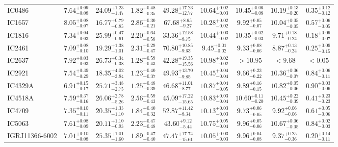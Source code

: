 \documentclass[onecolumn]{mn2e}
\begin{document}
{\begin{center}
\begin{longtable}{lcccccccc}
IC0486 & $7.64_{-0.08}^{+0.09}$ & $24.09_{-1.47}^{+1.23}$ & $1.82_{-0.35}^{+0.48}$ &$49.28_{-12.77}^{+17.23}$ & $10.64_{-0.03}^{+0.02}$ & $10.45_{-0.08}^{+0.06}$ & $10.19_{-0.20}^{+0.13}$ & $0.35_{-0.12}^{+0.12}$ \\
IC1657 & $8.05_{-0.07}^{+0.08}$ & $16.77_{-0.85}^{+0.79}$ & $2.86_{-0.21}^{+0.30}$ &$67.68_{-9.27}^{+8.65}$ & $10.28_{-0.02}^{+0.02}$ & $9.92_{-0.07}^{+0.05}$ & $10.04_{-0.05}^{+0.05}$ & $0.57_{-0.05}^{+0.06}$ \\
IC1816 & $7.34_{-0.03}^{+0.04}$ & $25.99_{-0.61}^{+0.47}$ & $2.20_{-0.58}^{+0.64}$ &$33.36_{-8.75}^{+12.58}$ & $10.44_{-0.02}^{+0.03}$ & $10.35_{-0.03}^{+0.02}$ & $9.71_{-0.24}^{+0.18}$ & $0.18_{-0.07}^{+0.09}$ \\
IC2461 & $7.09_{-0.10}^{+0.08}$ & $19.29_{-1.01}^{+1.38}$ & $2.31_{-0.47}^{+0.29}$ &$70.80_{-9.63}^{+10.85}$ & $9.45_{-0.02}^{+0.01}$ & $9.33_{-0.06}^{+0.08}$ & $8.87_{-0.24}^{+0.13}$ & $0.25_{-0.15}^{+0.09}$ \\
IC2637 & $7.92_{-0.03}^{+0.03}$ & $26.73_{-0.38}^{+0.34}$ & $1.28_{-0.43}^{+0.59}$ &$42.28_{-15.56}^{+19.35}$ & $10.98_{-0.02}^{+0.02}$ & $>10.95$ & $<9.68$ & $<0.05$ \\
IC2921 & $7.54_{-0.29}^{+0.39}$ & $18.35_{-3.84}^{+4.02}$ & $1.23_{-0.37}^{+0.40}$ &$49.93_{-9.85}^{+13.70}$ & $10.45_{-0.04}^{+0.04}$ & $9.66_{-0.22}^{+0.23}$ & $10.36_{-0.07}^{+0.06}$ & $0.84_{-0.11}^{+0.06}$ \\
IC4329A & $6.91_{-0.17}^{+0.15}$ & $25.71_{-2.75}^{+3.48}$ & $1.25_{-0.39}^{+0.48}$ &$46.68_{-8.77}^{+11.01}$ & $10.87_{-0.05}^{+0.04}$ & $9.89_{-0.15}^{+0.16}$ & $10.82_{-0.06}^{+0.05}$ & $0.90_{-0.06}^{+0.03}$ \\
IC4518A & $7.59_{-0.16}^{+0.37}$ & $26.06_{-5.26}^{+2.78}$ & $2.56_{-0.43}^{+0.59}$ &$45.09_{-15.65}^{+17.22}$ & $10.83_{-0.04}^{+0.03}$ & $10.60_{-0.20}^{+0.11}$ & $10.45_{-0.39}^{+0.22}$ & $0.41_{-0.23}^{+0.23}$ \\
IC4709 & $7.35_{-0.11}^{+0.10}$ & $20.35_{-1.10}^{+1.33}$ & $1.84_{-0.32}^{+0.40}$ &$52.87_{-8.34}^{+11.42}$ & $10.13_{-0.03}^{+0.03}$ & $9.73_{-0.05}^{+0.06}$ & $9.92_{-0.06}^{+0.06}$ & $0.61_{-0.06}^{+0.05}$ \\
IC5063 & $7.61_{-0.09}^{+0.08}$ & $20.11_{-0.93}^{+1.10}$ & $2.23_{-0.48}^{+0.47}$ &$43.60_{-5.44}^{+9.12}$ & $10.75_{-0.04}^{+0.05}$ & $9.96_{-0.06}^{+0.05}$ & $10.67_{-0.05}^{+0.06}$ & $0.84_{-0.03}^{+0.02}$ \\
IGRJ11366-6002 & $7.01_{-0.08}^{+0.10}$ & $25.35_{-1.60}^{+1.01}$ & $1.89_{-0.40}^{+0.47}$ &$47.47_{-15.61}^{+17.74}$ & $10.05_{-0.03}^{+0.03}$ & $9.96_{-0.08}^{+0.04}$ & $9.37_{-0.36}^{+0.25}$ & $0.20_{-0.11}^{+0.14}$ \\

\end{longtable}
\end{center}}
\end{document}
